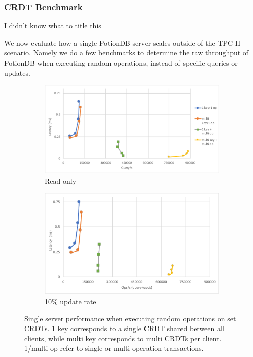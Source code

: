 \documentclass{vldb}
\newcommand{\grumbler}[2]{{\color{red}{\bf #1:} #2}}
\newcommand{\andre}[1]{\grumbler{andre}{#1}}
\begin{document}
\subsubsection{CRDT Benchmark}

\andre{I didn't know what to title this}

We now evaluate how a single PotionDB server scales outside of the TPC-H scenario.
Namely we do a few benchmarks to determine the raw throughput of PotionDB when executing random operations, instead of specific queries or updates.

\begin{figure}
		\centering
	\begin{subfigure}{.535\linewidth}
		\centering
		\includegraphics[width=.95\linewidth]{bench_read_cut}
		\caption{Read-only}
		\label{fig:bench_read}
	\end{subfigure}%
	\begin{subfigure}{.465\linewidth}
		\centering
		\includegraphics[width=.95\linewidth]{bench_update_cut}
		\caption{10\% update rate}
		\label{fig:bench_upd}
	\end{subfigure}
	\caption{Single server performance when executing random operations on set CRDTs. 1 key corresponds to a single CRDT shared between all clients, while multi key corresponds to multi CRDTs per client. 1/multi op refer to single or multi operation transactions.}
	\label{fig:bench}
\end{figure}
\end{document}
